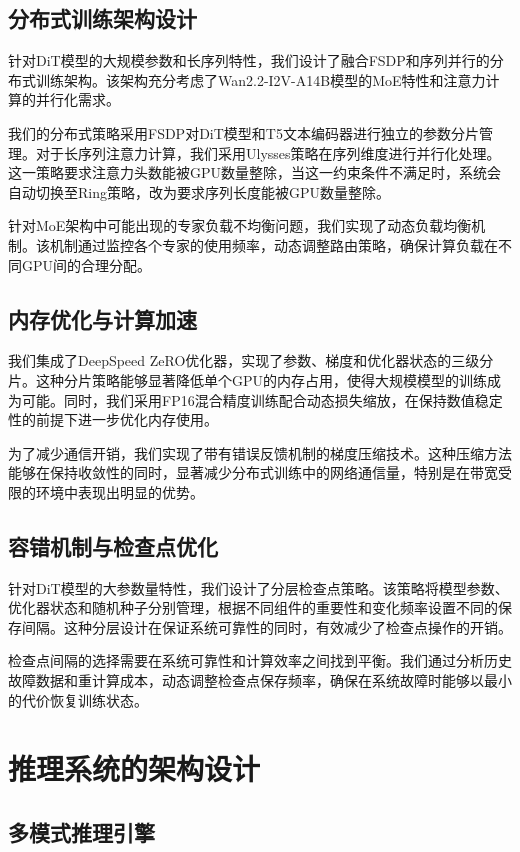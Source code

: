 \subsection{分布式训练架构设计}

针对DiT模型的大规模参数和长序列特性，我们设计了融合FSDP和序列并行的分布式训练架构。该架构充分考虑了Wan2.2-I2V-A14B模型的MoE特性和注意力计算的并行化需求。

我们的分布式策略采用FSDP对DiT模型和T5文本编码器进行独立的参数分片管理。对于长序列注意力计算，我们采用Ulysses策略在序列维度进行并行化处理。这一策略要求注意力头数能被GPU数量整除，当这一约束条件不满足时，系统会自动切换至Ring策略，改为要求序列长度能被GPU数量整除。

针对MoE架构中可能出现的专家负载不均衡问题，我们实现了动态负载均衡机制。该机制通过监控各个专家的使用频率，动态调整路由策略，确保计算负载在不同GPU间的合理分配。

\subsection{内存优化与计算加速}

我们集成了DeepSpeed ZeRO优化器，实现了参数、梯度和优化器状态的三级分片。这种分片策略能够显著降低单个GPU的内存占用，使得大规模模型的训练成为可能。同时，我们采用FP16混合精度训练配合动态损失缩放，在保持数值稳定性的前提下进一步优化内存使用。

为了减少通信开销，我们实现了带有错误反馈机制的梯度压缩技术。这种压缩方法能够在保持收敛性的同时，显著减少分布式训练中的网络通信量，特别是在带宽受限的环境中表现出明显的优势。

\subsection{容错机制与检查点优化}

针对DiT模型的大参数量特性，我们设计了分层检查点策略。该策略将模型参数、优化器状态和随机种子分别管理，根据不同组件的重要性和变化频率设置不同的保存间隔。这种分层设计在保证系统可靠性的同时，有效减少了检查点操作的开销。

检查点间隔的选择需要在系统可靠性和计算效率之间找到平衡。我们通过分析历史故障数据和重计算成本，动态调整检查点保存频率，确保在系统故障时能够以最小的代价恢复训练状态。

\section{推理系统的架构设计}

\subsection{多模式推理引擎}

